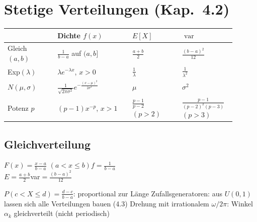 \section{Stetige Verteilungen (Kap.\ 4.2)}

\begin{merke}[{{Übersicht}}]
\begin{tabular}{@{}p{0.2\linewidth}p{0.3\linewidth}p{0.2\linewidth}@{}p{0.2\linewidth}@{}}
\toprule
 & \textbf{Dichte} $f(x)$ & $E[X]$ & $\operatorname{var}$\\
\midrule
Gleich $(a,b)$ & $\frac1{b-a}$ auf $(a,b]$ & $\frac{a+b}2$ & $\frac{(b-a)^2}{12}$\\[2pt]
Exp$(\lambda)$ & $\lambda e^{-\lambda x}$, $x>0$ & $\frac1\lambda$ & $\frac1{\lambda^2}$\\[2pt]
$N(\mu,\sigma)$ & $\frac1{\sqrt{2\pi\sigma^2}}e^{-\frac{(x-\mu)^2}{2\sigma^2}}$ & $\mu$ & $\sigma^2$\\[2pt]
Potenz $p$ & $(p-1)x^{-p}$, $x>1$ & $\frac{p-1}{p-2}$ $(p>2)$ & $\frac{p-1}{(p-2)^2(p-3)}$ $(p>3)$\\
\bottomrule
\end{tabular}
\end{merke}

\subsection{Gleichverteilung}
\begin{formel}
$F(x)=\frac{x-a}{b-a}$ $(a<x\le b)$\qquad $f=\frac1{b-a}$\\[1pt]
$E=\frac{a+b}2$\qquad var$=\frac{(b-a)^2}{12}$
\end{formel}
\begin{itemize}
\pfeil $P(c<X\le d)=\frac{d-c}{b-a}$: proportional zur Länge
\pfeil Zufallsgeneratoren: aus $U(0,1)$ lassen sich alle Verteilungen bauen (4.3)
\pfeil Drehung mit irrationalem $\omega/2\pi$: Winkel $\alpha_k$ gleichverteilt (nicht periodisch)
\end{itemize}

